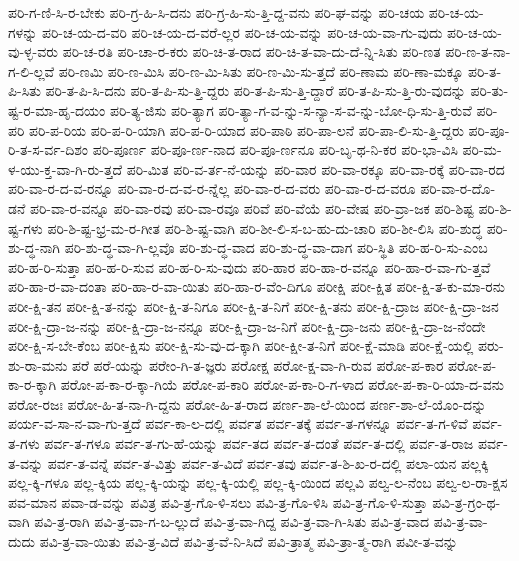 {ಪರಿ-ಗ-ಣಿ-ಸಿ-ರ-ಬೇಕು
ಪರಿ-ಗ್ರ-ಹಿ-ಸಿ-ದನು
ಪರಿ-ಗ್ರ-ಹಿ-ಸು-ತ್ತಿ-ದ್ದ-ವನು
ಪರಿ-ಘ-ವನ್ನು
ಪರಿ-ಚಯ
ಪರಿ-ಚ-ಯ-ಗಳನ್ನು
ಪರಿ-ಚ-ಯ-ದ-ವರಿ
ಪರಿ-ಚ-ಯ-ದ-ವರೆ-ಲ್ಲರ
ಪರಿ-ಚ-ಯ-ವನ್ನು
ಪರಿ-ಚ-ಯ-ವಾ-ಗು-ವುದು
ಪರಿ-ಚ-ಯ-ವು-ಳ್ಳ-ವರು
ಪರಿ-ಚ-ರತಿ
ಪರಿ-ಚಾ-ರ-ಕರು
ಪರಿ-ಚಿ-ತ-ರಾದ
ಪರಿ-ಚಿ-ತ-ವಾ-ದು-ದೆ-ನ್ನಿ-ಸಿತು
ಪರಿ-ಣತ
ಪರಿ-ಣ-ತ-ನಾ-ಗ-ಲಿ-ಲ್ಲವೆ
ಪರಿ-ಣಮಿ
ಪರಿ-ಣ-ಮಿಸಿ
ಪರಿ-ಣ-ಮಿ-ಸಿತು
ಪರಿ-ಣ-ಮಿ-ಸು-ತ್ತದೆ
ಪರಿ-ಣಾಮ
ಪರಿ-ಣಾ-ಮಕ್ಕೂ
ಪರಿ-ತ-ಪಿ-ಸಿತು
ಪರಿ-ತ-ಪಿ-ಸಿ-ದನು
ಪರಿ-ತ-ಪಿ-ಸು-ತ್ತಿ-ದ್ದರು
ಪರಿ-ತ-ಪಿ-ಸು-ತ್ತಿ-ದ್ದಾರೆ
ಪರಿ-ತ-ಪಿ-ಸು-ತ್ತಿ-ರು-ವುದನ್ನು
ಪರಿ-ತು-ಷ್ಟ-ರ-ಮಾ-ಹೃ-ದಯಂ
ಪರಿ-ತ್ಯ-ಜಿಸು
ಪರಿ-ತ್ಯಾಗ
ಪರಿ-ತ್ಯಾ-ಗ-ವ-ನ್ನು-ಸ-ನ್ಯಾ-ಸ-ವ-ನ್ನು-ಬೋ-ಧಿ-ಸು-ತ್ತಿ-ರುವೆ
ಪರಿ-ಪರಿ
ಪರಿ-ಪ-ರಿಯ
ಪರಿ-ಪ-ರಿ-ಯಾಗಿ
ಪರಿ-ಪ-ರಿ-ಯಾದ
ಪರಿ-ಪಾಠಿ
ಪರಿ-ಪಾ-ಲನೆ
ಪರಿ-ಪಾ-ಲಿ-ಸು-ತ್ತಿ-ದ್ದರು
ಪರಿ-ಪೂ-ರಿ-ತ-ಸ-ರ್ವ-ದಿಶಂ
ಪರಿ-ಪೂರ್ಣ
ಪರಿ-ಪೂ-ರ್ಣ-ನಾದ
ಪರಿ-ಪೂ-ರ್ಣನೂ
ಪರಿ-ಬೃ-ಥ-ನಿ-ಕರ
ಪರಿ-ಭಾ-ವಿಸಿ
ಪರಿ-ಮ-ಳ-ಯು-ಕ್ತ-ವಾ-ಗಿ-ರು-ತ್ತದೆ
ಪರಿ-ಮಿತ
ಪರಿ-ವ-ರ್ತ-ನೆ-ಯನ್ನು
ಪರಿ-ವಾರ
ಪರಿ-ವಾ-ರಕ್ಕೂ
ಪರಿ-ವಾ-ರಕ್ಕೆ
ಪರಿ-ವಾ-ರದ
ಪರಿ-ವಾ-ರ-ದ-ವ-ರನ್ನೂ
ಪರಿ-ವಾ-ರ-ದ-ವ-ರ-ನ್ನೆಲ್ಲ
ಪರಿ-ವಾ-ರ-ದ-ವರು
ಪರಿ-ವಾ-ರ-ದ-ವರೂ
ಪರಿ-ವಾ-ರ-ದೊ-ಡನೆ
ಪರಿ-ವಾ-ರ-ವನ್ನೂ
ಪರಿ-ವಾ-ರವು
ಪರಿ-ವಾ-ರವೂ
ಪರಿವೆ
ಪರಿ-ವೆಯೆ
ಪರಿ-ವೇಷ
ಪರಿ-ವ್ರಾ-ಜಕ
ಪರಿ-ಶಿಷ್ಟ
ಪರಿ-ಶಿ-ಷ್ಟ-ಗಳು
ಪರಿ-ಶಿ-ಷ್ಟ-ಭ್ರ-ಮ-ರ-ಗೀತ
ಪರಿ-ಶಿ-ಷ್ಟ-ವಾಗಿ
ಪರಿ-ಶೀ-ಲಿ-ಸ-ಬ-ಹು-ದು-ಚಾರಿ
ಪರಿ-ಶೀ-ಲಿಸಿ
ಪರಿ-ಶುದ್ಧ
ಪರಿ-ಶು-ದ್ಧ-ನಾಗಿ
ಪರಿ-ಶು-ದ್ಧ-ವಾ-ಗಿ-ಲ್ಲವೊ
ಪರಿ-ಶು-ದ್ಧ-ವಾದ
ಪರಿ-ಶು-ದ್ಧ-ವಾ-ದಾಗ
ಪರಿ-ಸ್ಥಿತಿ
ಪರಿ-ಹ-ರಿ-ಸು-ಎಂಬ
ಪರಿ-ಹ-ರಿ-ಸುತ್ತಾ
ಪರಿ-ಹ-ರಿ-ಸುವ
ಪರಿ-ಹ-ರಿ-ಸು-ವುದು
ಪರಿ-ಹಾರ
ಪರಿ-ಹಾ-ರ-ವನ್ನೂ
ಪರಿ-ಹಾ-ರ-ವಾ-ಗು-ತ್ತವೆ
ಪರಿ-ಹಾ-ರ-ವಾ-ದಂತಾ
ಪರಿ-ಹಾ-ರ-ವಾ-ಯಿತು
ಪರಿ-ಹಾ-ರ-ವೆಂ-ದಿಗೂ
ಪರೀಕ್ಷಿ
ಪರೀ-ಕ್ಷಿತ
ಪರೀ-ಕ್ಷಿ-ತ-ಕು-ಮಾ-ರನು
ಪರೀ-ಕ್ಷಿ-ತನ
ಪರೀ-ಕ್ಷಿ-ತ-ನನ್ನು
ಪರೀ-ಕ್ಷಿ-ತ-ನಿಗೂ
ಪರೀ-ಕ್ಷಿ-ತ-ನಿಗೆ
ಪರೀ-ಕ್ಷಿ-ತನು
ಪರೀ-ಕ್ಷಿ-ದ್ರಾಜ
ಪರೀ-ಕ್ಷಿ-ದ್ರಾ-ಜನ
ಪರೀ-ಕ್ಷಿ-ದ್ರಾ-ಜ-ನನ್ನು
ಪರೀ-ಕ್ಷಿ-ದ್ರಾ-ಜ-ನನ್ನೂ
ಪರೀ-ಕ್ಷಿ-ದ್ರಾ-ಜ-ನಿಗೆ
ಪರೀ-ಕ್ಷಿ-ದ್ರಾ-ಜನು
ಪರೀ-ಕ್ಷಿ-ದ್ರಾ-ಜ-ನೆಂದೇ
ಪರೀ-ಕ್ಷಿ-ಸ-ಬೇ-ಕೆಂಬ
ಪರೀ-ಕ್ಷಿಸು
ಪರೀ-ಕ್ಷಿ-ಸು-ವು-ದ-ಕ್ಕಾಗಿ
ಪರೀ-ಕ್ಷೀ-ತ-ನಿಗೆ
ಪರೀ-ಕ್ಷೆ-ಮಾಡಿ
ಪರೀ-ಕ್ಷೆ-ಯಲ್ಲಿ
ಪರು-ಶು-ರಾ-ಮನು
ಪರೆ
ಪರೆ-ಯನ್ನು
ಪರೇಂ-ಗಿ-ತ-ಜ್ಞರು
ಪರೋಕ್ಷ
ಪರೋ-ಕ್ಷ-ವಾ-ಗಿ-ರುವ
ಪರೋ-ಪ-ಕಾರ
ಪರೋ-ಪ-ಕಾ-ರ-ಕ್ಕಾಗಿ
ಪರೋ-ಪ-ಕಾ-ರ-ಕ್ಕಾ-ಗಿಯೆ
ಪರೋ-ಪ-ಕಾರಿ
ಪರೋ-ಪ-ಕಾ-ರಿ-ಗ-ಳಾದ
ಪರೋ-ಪ-ಕಾ-ರಿ-ಯಾ-ದ-ವನು
ಪರೋ-ರಜಃ
ಪರೋ-ಹಿ-ತ-ನಾ-ಗಿ-ದ್ದನು
ಪರೋ-ಹಿ-ತ-ರಾದ
ಪರ್ಣ-ಶಾ-ಲೆ-ಯಿಂದ
ಪರ್ಣ-ಶಾ-ಲೆ-ಯೊಂ-ದನ್ನು
ಪರ್ಯ-ವ-ಸಾ-ನ-ವಾ-ಗು-ತ್ತದೆ
ಪರ್ವ-ಕಾ-ಲ-ದಲ್ಲಿ
ಪರ್ವತ
ಪರ್ವ-ತಕ್ಕೆ
ಪರ್ವ-ತ-ಗಳನ್ನೂ
ಪರ್ವ-ತ-ಗ-ಳಿವೆ
ಪರ್ವ-ತ-ಗಳು
ಪರ್ವ-ತ-ಗಳೂ
ಪರ್ವ-ತ-ಗು-ಹೆ-ಯನ್ನು
ಪರ್ವ-ತದ
ಪರ್ವ-ತ-ದಂತೆ
ಪರ್ವ-ತ-ದಲ್ಲಿ
ಪರ್ವ-ತ-ರಾಜ
ಪರ್ವ-ತ-ವನ್ನು
ಪರ್ವ-ತ-ವನ್ನೆ
ಪರ್ವ-ತ-ವಿತ್ತು
ಪರ್ವ-ತ-ವಿದೆ
ಪರ್ವ-ತವು
ಪರ್ವ-ತ-ಶಿ-ಖ-ರ-ದಲ್ಲಿ
ಪಲಾ-ಯನ
ಪಲ್ಲಕ್ಕಿ
ಪಲ್ಲ-ಕ್ಕಿ-ಗಳೂ
ಪಲ್ಲ-ಕ್ಕಿಯ
ಪಲ್ಲ-ಕ್ಕಿ-ಯನ್ನು
ಪಲ್ಲ-ಕ್ಕಿ-ಯಲ್ಲಿ
ಪಲ್ಲ-ಕ್ಕಿ-ಯಿಂದ
ಪಲ್ಲವಿ
ಪಲ್ವ-ಲ-ನೆಂಬ
ಪಲ್ವ-ಲ-ರಾ-ಕ್ಷಸ
ಪವ-ಮಾನ
ಪವಾ-ಡ-ವನ್ನು
ಪವಿತ್ರ
ಪವಿ-ತ್ರ-ಗೊ-ಳಿ-ಸಲು
ಪವಿ-ತ್ರ-ಗೊ-ಳಿಸಿ
ಪವಿ-ತ್ರ-ಗೊ-ಳಿ-ಸುತ್ತಾ
ಪವಿ-ತ್ರ-ಗ್ರಂ-ಥ-ವಾಗಿ
ಪವಿ-ತ್ರ-ರಾಗಿ
ಪವಿ-ತ್ರ-ವಾ-ಗ-ಬ-ಲ್ಲುದೆ
ಪವಿ-ತ್ರ-ವಾ-ಗಿದ್ದ
ಪವಿ-ತ್ರ-ವಾ-ಗಿ-ಸಿತು
ಪವಿ-ತ್ರ-ವಾದ
ಪವಿ-ತ್ರ-ವಾ-ದುದು
ಪವಿ-ತ್ರ-ವಾ-ಯಿತು
ಪವಿ-ತ್ರ-ವಿದೆ
ಪವಿ-ತ್ರ-ವೆ-ನಿ-ಸಿದೆ
ಪವಿ-ತ್ರಾತ್ಮ
ಪವಿ-ತ್ರಾ-ತ್ಮ-ರಾಗಿ
ಪವೀ-ತ-ವನ್ನು
}
